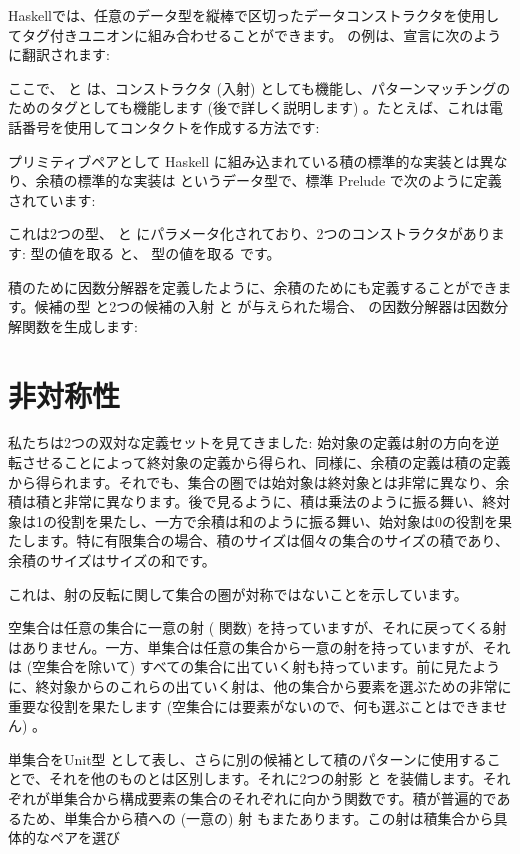 Haskellでは、任意のデータ型を縦棒で区切ったデータコンストラクタを使用してタグ付きユニオンに組み合わせることができます。 の例は、宣言に次のように翻訳されます:

ここで、 と  は、コンストラクタ (入射) としても機能し、パターンマッチングのためのタグとしても機能します (後で詳しく説明します) 。たとえば、これは電話番号を使用してコンタクトを作成する方法です:

プリミティブペアとして Haskell に組み込まれている積の標準的な実装とは異なり、余積の標準的な実装は  というデータ型で、標準 Prelude で次のように定義されています:

これは2つの型、 と  にパラメータ化されており、2つのコンストラクタがあります:  型の値を取る  と、 型の値を取る  です。

積のために因数分解器を定義したように、余積のためにも定義することができます。候補の型  と2つの候補の入射  と  が与えられた場合、 の因数分解器は因数分解関数を生成します:


\section{非対称性}

私たちは2つの双対な定義セットを見てきました: 始対象の定義は射の方向を逆転させることによって終対象の定義から得られ、同様に、余積の定義は積の定義から得られます。それでも、集合の圏では始対象は終対象とは非常に異なり、余積は積と非常に異なります。後で見るように、積は乗法のように振る舞い、終対象は1の役割を果たし、一方で余積は和のように振る舞い、始対象は0の役割を果たします。特に有限集合の場合、積のサイズは個々の集合のサイズの積であり、余積のサイズはサイズの和です。

これは、射の反転に関して集合の圏が対称ではないことを示しています。

空集合は任意の集合に一意の射 ( 関数) を持っていますが、それに戻ってくる射はありません。一方、単集合は任意の集合から一意の射を持っていますが、それは (空集合を除いて) すべての集合に出ていく射も持っています。前に見たように、終対象からのこれらの出ていく射は、他の集合から要素を選ぶための非常に重要な役割を果たします (空集合には要素がないので、何も選ぶことはできません) 。

単集合をUnit型 \code{()} として表し、さらに別の候補として積のパターンに使用することで、それを他のものとは区別します。それに2つの射影  と  を装備します。それぞれが単集合から構成要素の集合のそれぞれに向かう関数です。積が普遍的であるため、単集合から積への (一意の) 射  もまたあります。この射は積集合から具体的なペアを選び


